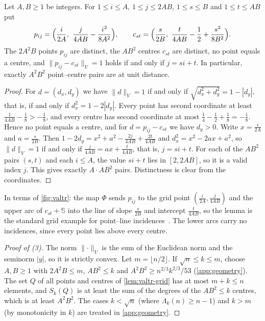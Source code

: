 \documentclass[anonymous,a4paper,USenglish,cleveref,autoref,thm-restate]{socg-lipics-v2021}
\newcommand{\Lam}{\Lambda}
\newcommand{\nrm}[1]{\lVert #1\rVert}
\begin{document}
\begin{lemma}
\label{lem:valtr-grid}
Let $A,B\ge1$ be integers. For $1\le i\le A$, $1\le j\le 2AB$, $1\le s\le B$ and $1\le t\le AB$ put
\[
  p_{ij}=\Bigl(\frac{i}{2A},\ \frac{j}{4AB}-\frac{i^2}{8A^2}\Bigr),
  \qquad
  c_{st}=\Bigl(\frac{s}{2B},\ \frac{t}{4AB}-\frac12+\frac{s^2}{8B^2}\Bigr).
\]
The $2A^2B$ points $p_{ij}$ are distinct, the $AB^2$ centres $c_{st}$ are distinct, no point equals a centre, and $\nrm{p_{ij}-c_{st}}_V=1$ holds if and only if $j=si+t$. In particular, exactly $A^2B^2$ point--centre pairs are at unit distance.
\end{lemma}

\begin{proof}
For $d=(d_x,d_y)$ we have $\nrm{d}_V=1$ if and only if $\sqrt{d_x^2+d_y^2}=1-|d_y|$, that is, if and only if $d_x^2=1-2|d_y|$. Every point has second coordinate at least $\frac1{4AB}-\frac18>-\frac18$, and every centre has second coordinate at most $\frac14-\frac12+\frac18=-\frac18$. Hence no point equals a centre, and for $d=p_{ij}-c_{st}$ we have $d_y>0$. Write $x=\frac{i}{2A}$ and $a=\frac{s}{2B}$. Then $1-2d_y=x^2+a^2-\frac{2j}{4AB}+\frac{2t}{4AB}$ and $d_x^2=x^2-2ax+a^2$, so $\nrm{d}_V=1$ if and only if $\frac{j}{4AB}=ax+\frac{t}{4AB}$, that is, $j=si+t$. For each of the $AB^2$ pairs $(s,t)$ and each $i\le A$, the value $si+t$ lies in $[2,2AB]$, so it is a valid index $j$. This gives exactly $A\cdot AB^2$ pairs. Distinctness is clear from the coordinates.
\end{proof}

In terms of \cref{fig:valtr}: the map $\Phi$ sends $p_{ij}$ to the grid point $(\frac{i}{2A},\frac{j}{4AB})$ and the upper arc of $c_{st}+\mathbb S$ into the line of slope $\frac{s}{2B}$ and intercept $\frac{t}{4AB}$, so the lemma is the standard grid example for point--line incidences~\cite{SzemerediTrotter83}. The lower arcs carry no incidences, since every point lies above every centre.

\begin{proof}[Proof of (3)]
The norm $\nrm{\cdot}_V$ is the sum of the Euclidean norm and the seminorm $|y|$, so it is strictly convex. Let $m=\lfloor n/2\rfloor$. If $\sqrt n\le k\le m$, choose $A,B\ge1$ with $2A^2B\le m$, $AB^2\le k$ and $A^2B^2\ge n^{2/3}k^{2/3}/53$ (\cref{app:geometry}). The set $Q$ of all points and centres of \cref{lem:valtr-grid} has at most $m+k\le n$ elements, and $S_k(Q)$ is at least the sum of the degrees of the $AB^2\le k$ centres, which is at least $A^2B^2$. The cases $k<\sqrt n$ (where $\Lam_k(n)\ge n-1$) and $k>m$ (by monotonicity in $k$) are treated in \cref{app:geometry}.
\end{proof}
\end{document}
